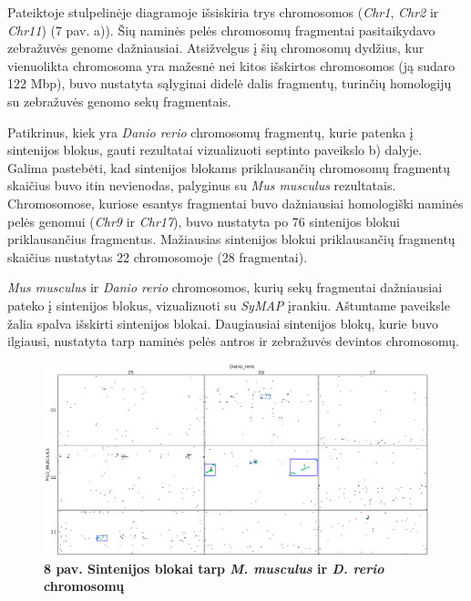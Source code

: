 \documentclass[12pt]{article}
\begin{document}
Pateiktoje stulpelinėje diagramoje išsiskiria trys chromosomos (\emph{Chr1},
\emph{Chr2} ir \emph{Chr11}) (7 pav. a)). Šių naminės pelės chromosomų fragmentai
pasitaikydavo zebražuvės genome dažniausiai. Atsižvelgus į šių chromosomų
dydžius, kur vienuolikta chromosoma yra mažesnė nei kitos išskirtos chromosomos
(ją sudaro 122 Mbp\cite{MGI}), buvo nustatyta sąlyginai didelė dalis fragmentų,
turinčių homologijų su zebražuvės genomo sekų fragmentais.

Patikrinus, kiek yra \emph{Danio rerio} chromosomų fragmentų, kurie patenka į
sintenijos blokus, gauti rezultatai vizualizuoti septinto paveikslo b) dalyje.
Galima pastebėti, kad sintenijos blokams priklausančių chromosomų fragmentų
skaičius buvo itin nevienodas, palyginus su \emph{Mus musculus} rezultatais.
Chromosomose, kuriose esantys fragmentai buvo dažniausiai homologiški naminės
pelės genomui (\emph{Chr9} ir \emph{Chr17}), buvo nustatyta po 76 sintenijos
blokui priklausančius fragmentus. Mažiausias sintenijos blokui priklausančių
fragmentų skaičius nustatytas 22 chromosomoje (28 fragmentai).

\emph{Mus musculus} ir \emph{Danio rerio} chromosomos, kurių sekų fragmentai
dažniausiai pateko į sintenijos blokus, vizualizuoti su \emph{SyMAP} įrankiu.
Aštuntame paveiksle žalia spalva išskirti sintenijos blokai. Daugiausiai
sintenijos blokų, kurie buvo ilgiausi, nustatyta tarp naminės pelės antros
ir zebražuvės devintos chromosomų.

\newpage

\begin{figure}[htb]
    \begin{center}
        \includegraphics[width=0.8\linewidth]{../Figures/Blocks_Chr2_9.png}
        \vspace{-1\baselineskip}
        \caption*{\small\textbf{8 pav. Sintenijos blokai tarp \emph{M. musculus}
        ir \emph{D. rerio} chromosomų}}
        \label{fig:birds}
    \end{center}
\end{figure}
\end{document}
